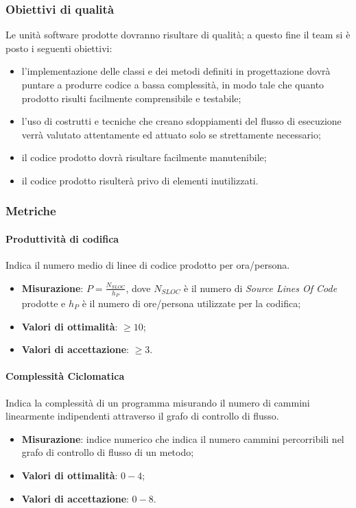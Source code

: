 \subsubsection{Obiettivi di qualità}
Le unità software prodotte dovranno risultare di qualità; a questo fine il team si è posto i seguenti obiettivi:
\begin{itemize}
\item l'implementazione delle classi e dei metodi definiti in progettazione dovrà puntare a produrre codice a bassa complessità, in modo tale che quanto prodotto risulti facilmente comprensibile e testabile;
\item l'uso di costrutti e tecniche che creano sdoppiamenti del flusso di esecuzione verrà valutato attentamente ed attuato solo se strettamente necessario;
\item il codice prodotto dovrà risultare facilmente manutenibile;
\item il codice prodotto risulterà privo di elementi inutilizzati.
\end{itemize}
\subsubsection{Metriche}
\paragraph{Produttività di codifica}
\label{prodCod}
Indica il numero medio di linee di codice prodotto per ora/persona.
\begin{itemize}
\item \textbf{Misurazione}: $P=\frac{N_{SLOC}}{h_{P}}$, dove $N_{SLOC}$ è il numero di \textit{Source Lines Of Code} prodotte e $h_{P}$ è il numero di ore/persona utilizzate per la codifica;
\item \textbf{Valori di ottimalità}: $\geq 10$;
\item \textbf{Valori di accettazione}: $\geq 3$.
\end{itemize}
\paragraph{Complessità Ciclomatica}
\label{complCiclom}
Indica la complessità di un programma misurando il numero di cammini linearmente indipendenti attraverso il grafo di controllo di flusso.
\begin{itemize}
\item \textbf{Misurazione}: indice numerico che indica il numero cammini percorribili nel grafo di controllo di flusso di un metodo;
\item \textbf{Valori di ottimalità}: $0 - 4$;
\item \textbf{Valori di accettazione}: $0 - 8$.
\end{itemize}
